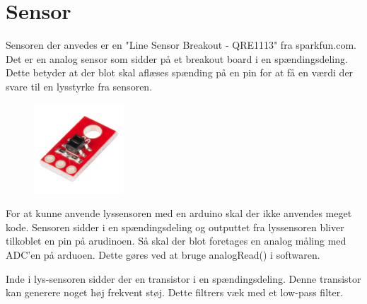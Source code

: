 \section{Sensor}
Sensoren der anvedes er en "Line Sensor Breakout - QRE1113" fra sparkfun.com. Det er en analog sensor som sidder på et breakout board i en spændingsdeling. Dette betyder at der blot skal aflæses spænding på en pin for at få en værdi der svare til en lysstyrke fra sensoren.

\begin{figure}[h!]
  \centering
  \includegraphics[width=0.3\textwidth]{figures/lyssensor.png}
\end{figure}

For at kunne anvende lyssensoren med en arduino skal der ikke anvendes meget kode. Sensoren sidder i en spændingsdeling og outputtet fra lyssensoren bliver tilkoblet en pin på arudinoen. Så skal der blot foretages en analog måling med ADC'en på arduoen. 
Dette gøres ved at bruge analogRead() i softwaren.


Inde i lys-sensoren sidder der en transistor i en spændingsdeling. Denne transistor kan generere noget høj frekvent støj. Dette filtrers væk med et low-pass filter.